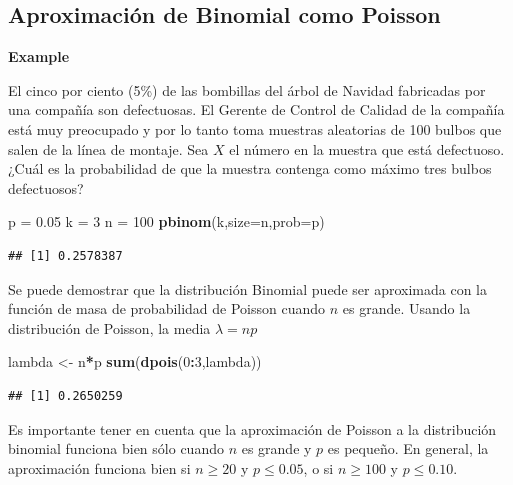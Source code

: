 \documentclass[]{book}
\newenvironment{Shaded}{\begin{snugshade}}{\end{snugshade}}
\newcommand{\KeywordTok}[1]{\textcolor[rgb]{0.13,0.29,0.53}{\textbf{#1}}}
\newcommand{\DataTypeTok}[1]{\textcolor[rgb]{0.13,0.29,0.53}{#1}}
\newcommand{\DecValTok}[1]{\textcolor[rgb]{0.00,0.00,0.81}{#1}}
\newcommand{\FloatTok}[1]{\textcolor[rgb]{0.00,0.00,0.81}{#1}}
\newcommand{\StringTok}[1]{\textcolor[rgb]{0.31,0.60,0.02}{#1}}
\newcommand{\OperatorTok}[1]{\textcolor[rgb]{0.81,0.36,0.00}{\textbf{#1}}}
\newcommand{\NormalTok}[1]{#1}
\begin{document}
\subsection{Aproximación de Binomial como
Poisson}\label{aproximacion-de-binomial-como-poisson}

\textbf{Example}

El cinco por ciento (5\%) de las bombillas del árbol de Navidad
fabricadas por una compañía son defectuosas. El Gerente de Control de
Calidad de la compañía está muy preocupado y por lo tanto toma muestras
aleatorias de 100 bulbos que salen de la línea de montaje. Sea \(X\) el
número en la muestra que está defectuoso. ¿Cuál es la probabilidad de
que la muestra contenga como máximo tres bulbos defectuosos?

\begin{Shaded}
\begin{Highlighting}[]
\NormalTok{p =}\StringTok{ }\FloatTok{0.05}
\NormalTok{k =}\StringTok{ }\DecValTok{3}
\NormalTok{n =}\StringTok{ }\DecValTok{100}
\KeywordTok{pbinom}\NormalTok{(k,}\DataTypeTok{size=}\NormalTok{n,}\DataTypeTok{prob=}\NormalTok{p)}
\end{Highlighting}
\end{Shaded}

\begin{verbatim}
## [1] 0.2578387
\end{verbatim}

Se puede demostrar que la distribución Binomial puede ser aproximada con
la función de masa de probabilidad de Poisson cuando \(n\) es grande.
Usando la distribución de Poisson, la media \(\lambda = np\)

\begin{Shaded}
\begin{Highlighting}[]
\NormalTok{lambda <-}\StringTok{ }\NormalTok{n}\OperatorTok{*}\NormalTok{p}
\KeywordTok{sum}\NormalTok{(}\KeywordTok{dpois}\NormalTok{(}\DecValTok{0}\OperatorTok{:}\DecValTok{3}\NormalTok{,lambda))}
\end{Highlighting}
\end{Shaded}

\begin{verbatim}
## [1] 0.2650259
\end{verbatim}

Es importante tener en cuenta que la aproximación de Poisson a la
distribución binomial funciona bien sólo cuando \(n\) es grande y \(p\)
es pequeño. En general, la aproximación funciona bien si \(n \geq 20\) y
\(p\leq0.05\), o si \(n\geq 100\) y \(p\leq 0.10\).
\end{document}
